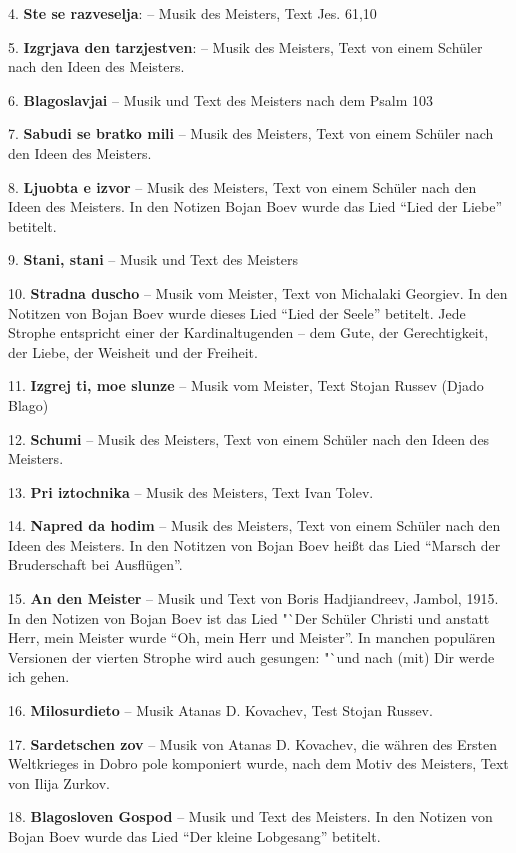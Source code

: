 \documentclass[11pt,a5paper,twoside]{article}
\begin{document}
4. \textbf{Ste se razveselja}: -- Musik des Meisters, Text Jes. 61,10

5. \textbf{Izgrjava den tarzjestven}: -- Musik des Meisters, Text von einem Schüler nach den Ideen des Meisters.

6. \textbf{Blagoslavjai} -- Musik und Text des Meisters nach dem Psalm 103

7. \textbf{Sabudi se bratko mili} -- Musik des Meisters, Text von einem Schüler nach den Ideen des Meisters.

8. \textbf{Ljuobta e izvor} -- Musik des Meisters, Text von einem Schüler nach den Ideen des Meisters. In den Notizen Bojan Boev wurde das Lied "`Lied der Liebe"' betitelt.

9. \textbf{Stani, stani} -- Musik und Text des Meisters 

10. \textbf{Stradna duscho} -- Musik vom Meister, Text von Michalaki Georgiev. In den Notitzen von Bojan Boev wurde dieses Lied "`Lied der Seele"' betitelt. Jede Strophe entspricht einer der Kardinaltugenden -- dem Gute, der Gerechtigkeit, der Liebe, der Weisheit und der Freiheit.

11. \textbf{Izgrej ti, moe slunze}  -- Musik vom Meister, Text Stojan Russev (Djado Blago)

12. \textbf{Schumi} -- Musik des Meisters, Text von einem Schüler nach den Ideen des Meisters.

13. \textbf{Pri iztochnika} -- Musik des Meisters, Text Ivan Tolev.

14. \textbf{Napred da hodim} -- Musik des Meisters, Text von einem Schüler nach den Ideen des Meisters. In den Notitzen von Bojan Boev heißt das Lied "`Marsch der Bruderschaft bei Ausflügen"'.

15. \textbf{An den Meister} -- Musik und Text von Boris Hadjiandreev, Jambol, 1915. In den Notizen von Bojan Boev ist das Lied "`Der Schüler Christi und anstatt Herr, mein Meister wurde "`Oh, mein Herr und Meister"'. In manchen populären Versionen der vierten Strophe wird auch gesungen: "`und nach (mit) Dir werde ich gehen. 

16. \textbf{Milosurdieto} -- Musik Atanas D. Kovachev, Test Stojan Russev. 

17. \textbf{Sardetschen zov} -- Musik von Atanas D. Kovachev, die währen des Ersten Weltkrieges in Dobro pole komponiert wurde, nach dem Motiv des Meisters, Text von Ilija Zurkov.

18. \textbf{Blagosloven Gospod} -- Musik und Text des Meisters. In den Notizen von Bojan Boev wurde das Lied "`Der kleine Lobgesang"' betitelt. 
\end{document}
